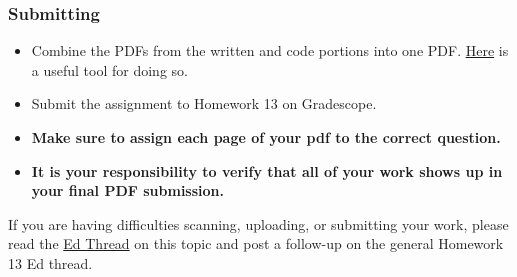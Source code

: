 \documentclass[11pt]{article}
\providecommand{\tightlist}{%
      \setlength{\itemsep}{0pt}\setlength{\parskip}{0pt}}
\begin{document}
\hypertarget{submitting}{%
\subsubsection{Submitting}\label{submitting}}

\begin{itemize}
\tightlist
\item
  Combine the PDFs from the written and code portions into one PDF.
  \href{https://smallpdf.com/merge-pdf}{Here} is a useful tool for doing
  so.
\item
  Submit the assignment to Homework 13 on Gradescope.
\item
  \textbf{Make sure to assign each page of your pdf to the correct
  question.}
\item
  \textbf{It is your responsibility to verify that all of your work
  shows up in your final PDF submission.}
\end{itemize}

If you are having difficulties scanning, uploading, or submitting your
work, please read the
\href{https://edstem.org/us/courses/94054/discussion/7533569}{Ed Thread}
on this topic and post a follow-up on the general Homework 13 Ed thread.


    
    
    
\end{document}
